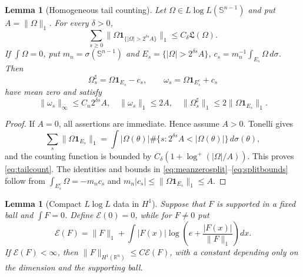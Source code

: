 \documentclass[11pt]{article}
\numberwithin{equation}{section}
\newtheorem{lemma}[theorem]{Lemma}
\theoremstyle{remark}
\theoremstyle{definition}
\newcommand{\R}{\mathbb R}
\newcommand{\Sph}{\mathbb S}
\newcommand{\norm}[1]{\lVert #1\rVert}
\begin{document}
\begin{lemma}[Homogeneous tail counting]\label{lem:tailcount}
Let $\Omega\in L\log L(\Sph^{n-1})$ and put $A=\norm\Omega_1$.
For every $\delta>0$,
\begin{equation}\label{eq:tailcount}
 \sum_{s\ge0}\norm{\Omega\mathbf1_{\{|\Omega|>2^{\delta s}A\}}}_1
 \le C_\delta\mathfrak L(\Omega).
\end{equation}
If $\int\Omega=0$, put $m_n=\sigma(\Sph^{n-1})$ and
$E_s=\{|\Omega|>2^{\delta s}A\}$,
$c_s=m_n^{-1}\int_{E_s}\Omega\,d\sigma$.  Then
\begin{equation}\label{eq:meanzerosplit}
 \Omega_s^\sharp=\Omega\mathbf1_{E_s}-c_s,
 \qquad \omega_s=\Omega\mathbf1_{E_s^c}+c_s
\end{equation}
have mean zero and satisfy
\begin{equation}\label{eq:splitbounds}
 \norm{\omega_s}_\infty\le C_n2^{\delta s}A,
 \quad \norm{\omega_s}_1\le2A,
 \quad \norm{\Omega_s^\sharp}_1\le2\norm{\Omega\mathbf1_{E_s}}_1.
\end{equation}
\end{lemma}

\begin{proof}
If $A=0$, all assertions are immediate.  Hence assume $A>0$.
Tonelli gives
\[
\sum_s\norm{\Omega\mathbf1_{E_s}}_1
 =\int|\Omega(\theta)|\#\{s:2^{\delta s}A<|\Omega(\theta)|\}\,d\sigma(\theta),
\]
and the counting function is bounded by
$C_\delta(1+\log^+(|\Omega|/A))$.  This proves \eqref{eq:tailcount}.
The identities and bounds in \eqref{eq:meanzerosplit}--\eqref{eq:splitbounds}
follow from $\int_{E_s^c}\Omega=-m_nc_s$ and
$m_n|c_s|\le\norm{\Omega\mathbf1_{E_s}}_1\le A$.
\end{proof}

\begin{lemma}[Compact $L\log L$ data in $H^1$]\label{lem:LlogL-H1}
Suppose that $F$ is supported in a fixed ball and $\int F=0$.  Define
$\mathcal E(0)=0$, while for $F\ne0$ put
\[
 \mathcal E(F)=\norm F_1+
 \int |F(x)|\log\!\left(e+\frac{|F(x)|}{\norm F_1}\right)dx.
\]
If $\mathcal E(F)<\infty$, then
$\norm F_{H^1(\R^n)}\le C\mathcal E(F)$, with a constant depending only
on the dimension and the supporting ball.
\end{lemma}
\end{document}
